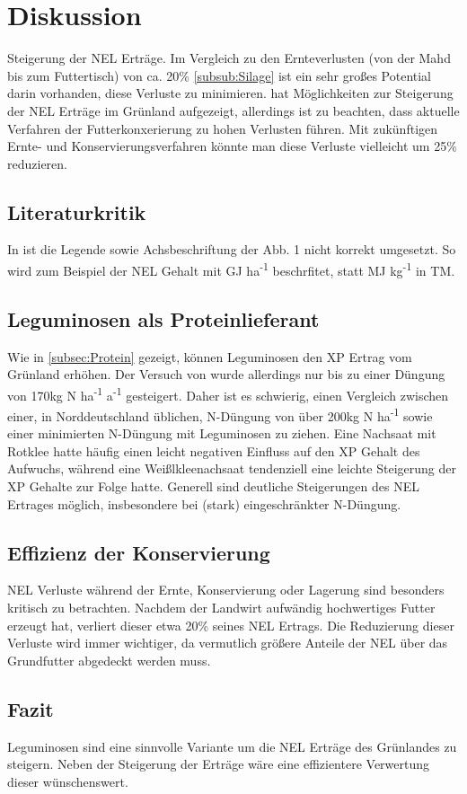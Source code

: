 
\section{Diskussion}
\label{sec:Disukussion}
Steigerung der \ac{NEL} Erträge.
Im Vergleich zu den Ernteverlusten (von der Mahd bis zum Futtertisch) von ca. 20\% \cref{subsub:Silage} ist ein sehr großes Potential darin vorhanden, diese Verluste zu minimieren.
\textcite[33-36]{weggler2050leguminosen} hat Möglichkeiten zur Steigerung der \ac{NEL} Erträge im Grünland aufgezeigt, allerdings ist zu beachten, dass aktuelle Verfahren der Futterkonxerierung zu hohen Verlusten führen.
Mit zukünftigen Ernte- und Konservierungsverfahren könnte man diese Verluste vielleicht um 25\% reduzieren.

\subsection{Literaturkritik}
\label{sub:kritik}
In \textcite[35]{weggler2050leguminosen} ist die Legende sowie Achsbeschriftung der Abb. 1 nicht korrekt umgesetzt.
So wird zum Beispiel der \ac{NEL} Gehalt mit GJ ha\textsuperscript{-1} beschrfitet, statt MJ kg\textsuperscript{-1} in \ac{TM}.

\subsection{Leguminosen als Proteinlieferant}
\label{sub:leguminosen}
Wie in \ref{subsec:Protein} gezeigt, können Leguminosen den \ac{XP} Ertrag vom Grünland erhöhen.
Der Versuch von \textcite[33-36]{weggler2050leguminosen} wurde allerdings nur bis zu einer Düngung von 170kg N ha\textsuperscript{-1} a\textsuperscript{-1} gesteigert.
Daher ist es schwierig, einen Vergleich zwischen einer, in Norddeutschland üblichen, N-Düngung von über 200kg N ha\textsuperscript{-1} sowie einer minimierten N-Düngung mit Leguminosen zu ziehen.
Eine Nachsaat mit Rotklee hatte häufig einen leicht negativen Einfluss auf den \ac{XP} Gehalt des Aufwuchs, während eine Weißlkleenachsaat tendenziell eine leichte Steigerung der \ac{XP} Gehalte zur Folge hatte.
Generell sind deutliche Steigerungen des \ac{NEL} Ertrages möglich, insbesondere bei (stark) eingeschränkter N-Düngung.

\subsection{Effizienz der Konservierung}
\label{sub:konservierung}
\ac{NEL} Verluste während der Ernte, Konservierung oder Lagerung sind besonders kritisch zu betrachten.
Nachdem der Landwirt aufwändig hochwertiges Futter erzeugt hat, verliert dieser etwa 20\% seines \ac{NEL} Ertrags.
Die Reduzierung dieser Verluste wird immer wichtiger, da vermutlich größere Anteile der \ac{NEL} über das Grundfutter abgedeckt werden muss.

\subsection{Fazit}
\label{subsec:fazit}
Leguminosen sind eine sinnvolle Variante um die \ac{NEL} Erträge des Grünlandes zu steigern.
Neben der Steigerung der Erträge wäre eine effizientere Verwertung dieser wünschenswert.
